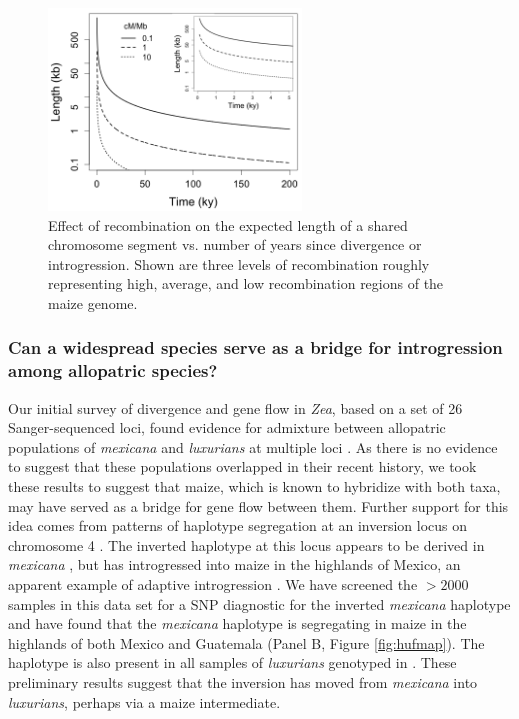 \begin{figure}
  \centering
   \includegraphics[width=0.6\textwidth]{length_vs_time2}
    \caption{Effect of recombination on the expected length of a shared chromosome segment vs. number of years since divergence or introgression.  Shown are three levels of recombination roughly representing high, average, and low recombination regions of the maize genome.} 
\label{fig:length}
\end{figure}

\subsubsection{Can a widespread species serve as a bridge for introgression among allopatric species?}
\label{sss:bridge}

Our initial survey of divergence and gene flow in \emph{Zea}, based on a set of 26 Sanger-sequenced loci, found evidence for admixture between allopatric populations of \emph{mexicana} and \emph{luxurians} at multiple loci \citep{Ross-Ibarra2009a}. 
As there is no evidence to suggest that these populations overlapped in their recent history, we took these results to suggest that maize, which is known to hybridize with both taxa, may have served as a bridge for gene flow between them.
Further support for this idea comes from patterns of haplotype segregation at an inversion locus on chromosome 4 \citep[\emph{Inv4m};][]{Fang2012,Pyhajarvi2013,Hufford2013}. 
The inverted haplotype at this locus appears to be derived in \emph{mexicana} \citep{Pyhajarvi2013}, but has introgressed into maize in the highlands of Mexico, an apparent example of adaptive introgression \citep[Panel A, Figure \ref{fig:hufmap};][]{Hufford2013}.
We have screened the $>2000$ samples in this data set for a SNP diagnostic for the inverted \emph{mexicana} haplotype and have found that the \emph{mexicana} haplotype is segregating in maize in the highlands of both Mexico and Guatemala (Panel B, Figure \ref{fig:hufmap}).  The haplotype is also present in all samples of \emph{luxurians} genotyped in \citet{Fang2012}.
These preliminary results suggest that the inversion has moved from \emph{mexicana} into \emph{luxurians}, perhaps via a maize intermediate.

